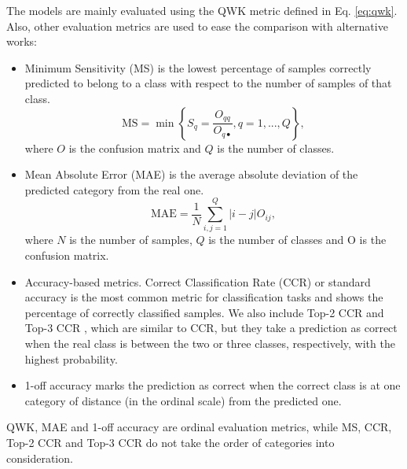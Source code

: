 \documentclass[journal]{IEEEtran}
\begin{document}
	The models are mainly evaluated using the QWK metric defined in Eq. \eqref{eq:qwk}. Also, other evaluation metrics are used to ease the comparison with alternative works:
	\begin{itemize}
		\item Minimum Sensitivity (MS) \cite{cruz2014metrics} is the lowest percentage of samples correctly predicted to belong to a class with respect to the number of samples of that class.
		\begin{equation}
			\nonumber
			\text{MS} = \min\left\lbrace S_q = \frac{O_{qq}}{O_{q\bullet}}, q = 1, ..., Q \right\rbrace,
		\end{equation}
		where $O$ is the confusion matrix and $Q$ is the number of classes.
		
		\item Mean Absolute Error (MAE) \cite{cruz2014metrics} is the average absolute deviation of the predicted category from the real one.
		\begin{equation}
			\nonumber
			\text{MAE} = \frac{1}{N} \sum^Q_{i,j = 1} |i-j|O_{ij},
		\end{equation}
		where $N$ is the number of samples, $Q$ is the number of classes and O is the confusion matrix.
		
		\item Accuracy-based metrics. Correct Classification Rate (CCR) or standard accuracy is the most common metric for classification tasks and shows the percentage of correctly classified samples. We also include Top-2 CCR \cite{beckham2017unimodal} and Top-3 CCR \cite{beckham2017unimodal}, which are similar to CCR, but they take a prediction as correct when the real class is between the two or three classes, respectively, with the highest probability.
		
		\item 1-off accuracy \cite{eidinger2014age,chen2016cascaded,levi2015age} marks the prediction as correct when the correct class is at one category of distance (in the ordinal scale) from the predicted one.
	\end{itemize}
	QWK, MAE and 1-off accuracy are ordinal evaluation metrics, while MS, CCR, Top-2 CCR and Top-3 CCR do not take the order of categories into consideration.
	
\end{document}
